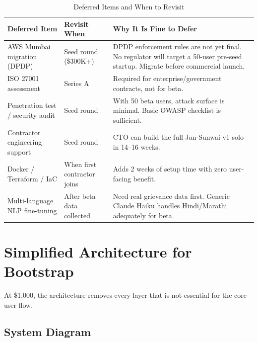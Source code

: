 \documentclass[12pt, a4paper]{article}
\begin{document}
\begin{table}[ht]
\centering
\caption{Deferred Items and When to Revisit}
\renewcommand{\arraystretch}{1.4}
\begin{tabularx}{\textwidth}{X p{2.5cm} X}
\toprule
\rowcolor{pollitylightblue}
\textbf{Deferred Item} & \textbf{Revisit When} & \textbf{Why It Is Fine to Defer} \\
\midrule
AWS Mumbai migration (DPDP)      & Seed round (\$300K+) & DPDP enforcement rules are not yet final. No regulator will target a 50-user pre-seed startup. Migrate before commercial launch. \\
ISO 27001 assessment             & Series A             & Required for enterprise/government contracts, not for beta. \\
Penetration test / security audit & Seed round          & With 50 beta users, attack surface is minimal. Basic OWASP checklist is sufficient. \\
Contractor engineering support   & Seed round           & CTO can build the full Jan-Sunwai v1 solo in 14--16 weeks. \\
Docker / Terraform / IaC         & When first contractor joins & Adds 2 weeks of setup time with zero user-facing benefit. \\
Multi-language NLP fine-tuning   & After beta data collected & Need real grievance data first. Generic Claude Haiku handles Hindi/Marathi adequately for beta. \\
\bottomrule
\end{tabularx}
\end{table}

\newpage

\section{Simplified Architecture for Bootstrap}

At \$1,000, the architecture removes every layer that is not essential for the core user flow.

\subsection{System Diagram}
\end{document}
